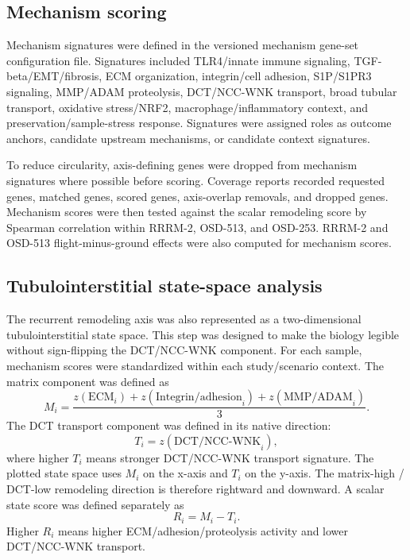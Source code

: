 \documentclass[11pt]{article}
\begin{document}
\subsection{Mechanism scoring}

Mechanism signatures were defined in the versioned mechanism gene-set configuration file. Signatures included TLR4/innate immune signaling, TGF-beta/EMT/fibrosis, ECM organization, integrin/cell adhesion, S1P/S1PR3 signaling, MMP/ADAM proteolysis, DCT/NCC-WNK transport, broad tubular transport, oxidative stress/NRF2, macrophage/inflammatory context, and preservation/sample-stress response. Signatures were assigned roles as outcome anchors, candidate upstream mechanisms, or candidate context signatures.

To reduce circularity, axis-defining genes were dropped from mechanism signatures where possible before scoring. Coverage reports recorded requested genes, matched genes, scored genes, axis-overlap removals, and dropped genes. Mechanism scores were then tested against the scalar remodeling score by Spearman correlation within RRRM-2, OSD-513, and OSD-253. RRRM-2 and OSD-513 flight-minus-ground effects were also computed for mechanism scores.

\subsection{Tubulointerstitial state-space analysis}

The recurrent remodeling axis was also represented as a two-dimensional tubulointerstitial state space. This step was designed to make the biology legible without sign-flipping the DCT/NCC-WNK component. For each sample, mechanism scores were standardized within each study/scenario context. The matrix component was defined as
\begin{equation}
M_i=\frac{z(\mathrm{ECM}_i)+z(\mathrm{Integrin/adhesion}_i)+z(\mathrm{MMP/ADAM}_i)}{3}.
\end{equation}
The DCT transport component was defined in its native direction:
\begin{equation}
T_i=z(\mathrm{DCT/NCC\mbox{-}WNK}_i),
\end{equation}
where higher $T_i$ means stronger DCT/NCC-WNK transport signature. The plotted state space uses $M_i$ on the x-axis and $T_i$ on the y-axis. The matrix-high / DCT-low remodeling direction is therefore rightward and downward. A scalar state score was defined separately as
\begin{equation}
R_i=M_i-T_i.
\end{equation}
Higher $R_i$ means higher ECM/adhesion/proteolysis activity and lower DCT/NCC-WNK transport.
\end{document}
